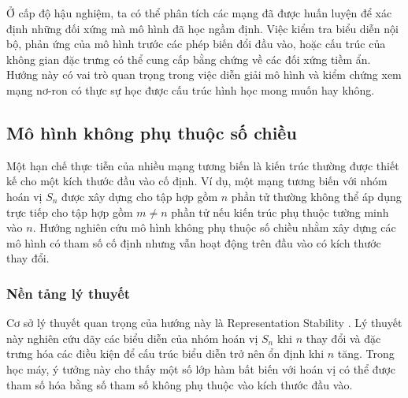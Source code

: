 Ở cấp độ hậu nghiệm, ta có thể phân tích các mạng đã được huấn luyện để xác định những đối xứng mà mô hình đã học ngầm định. Việc kiểm tra biểu diễn nội bộ, phản ứng của mô hình trước các phép biến đổi đầu vào, hoặc cấu trúc của không gian đặc trưng có thể cung cấp bằng chứng về các đối xứng tiềm ẩn. Hướng này có vai trò quan trọng trong việc diễn giải mô hình và kiểm chứng xem mạng nơ-ron có thực sự học được cấu trúc hình học mong muốn hay không.


\subsection{Mô hình không phụ thuộc số chiều}
\label{subsec:any-dimensional}



Một hạn chế thực tiễn của nhiều mạng tương biến là kiến trúc thường được thiết kế cho một kích thước đầu vào cố định. Ví dụ, một mạng tương biến với nhóm hoán vị $S_n$ được xây dựng cho tập hợp gồm $n$ phần tử thường không thể áp dụng trực tiếp cho tập hợp gồm $m \neq n$ phần tử nếu kiến trúc phụ thuộc tường minh vào $n$. Hướng nghiên cứu mô hình không phụ thuộc số chiều nhằm xây dựng các mô hình có tham số cố định nhưng vẫn hoạt động trên đầu vào có kích thước thay đổi.

\subsubsection{Nền tảng lý thuyết}

Cơ sở lý thuyết quan trọng của hướng này là Representation Stability \cite{farb2014representation}. Lý thuyết này nghiên cứu dãy các biểu diễn của nhóm hoán vị $S_n$ khi $n$ thay đổi và đặc trưng hóa các điều kiện để cấu trúc biểu diễn trở nên ổn định khi $n$ tăng. Trong học máy, ý tưởng này cho thấy một số lớp hàm bất biến với hoán vị có thể được tham số hóa bằng số tham số không phụ thuộc vào kích thước đầu vào.

